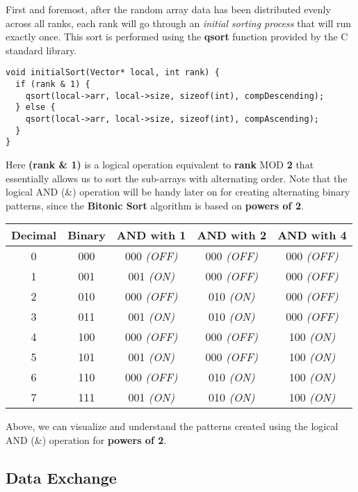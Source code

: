 \documentclass[12pt]{report}
\begin{document}
First and foremost, after the random array data has been distributed evenly across all ranks, each rank will go through an \textit{initial sorting process} that will run exactly once. This sort is performed using the \textbf{qsort} function provided by the C standard library.
\begin{lstlisting}[style=cstyle]
void initialSort(Vector* local, int rank) {
  if (rank & 1) {
    qsort(local->arr, local->size, sizeof(int), compDescending);
  } else { 
    qsort(local->arr, local->size, sizeof(int), compAscending);
  }
}
\end{lstlisting}
Here \textbf{(rank \& 1)} is a logical operation equivalent to \textbf{rank} MOD \textbf{2}  that essentially allows us to sort the sub-arrays with alternating order. 
Note that the logical AND (\&) operation will be handy later on for creating alternating binary patterns, since the \textbf{Bitonic Sort} algorithm is based on \textbf{powers of 2}.

\vspace{1cm}
\begin{tabular}{|c|c|c|c|c|}
\hline
\textbf{Decimal} & \textbf{Binary} & \textbf{AND with 1} & \textbf{AND with 2} & \textbf{AND with 4} \\ \hline
0 & 000 & 000 \textit{(OFF)}& 000 \textit{(OFF)}& 000 \textit{(OFF)}\\ \hline
1 & 001 & 001 \textit{(ON)}& 000 \textit{(OFF)}& 000 \textit{(OFF)}\\ \hline
2 & 010 & 000 \textit{(OFF)}& 010 \textit{(ON)}& 000 \textit{(OFF)}\\ \hline
3 & 011 & 001 \textit{(ON)}& 010 \textit{(ON)}& 000 \textit{(OFF)}\\ \hline
4 & 100 & 000 \textit{(OFF)}& 000 \textit{(OFF)}& 100 \textit{(ON)}\\ \hline
5 & 101 & 001 \textit{(ON)}& 000 \textit{(OFF)}& 100 \textit{(ON)}\\ \hline
6 & 110 & 000 \textit{(OFF)}& 010 \textit{(ON)}& 100 \textit{(ON)}\\ \hline
7 & 111 & 001 \textit{(ON)}& 010 \textit{(ON)}& 100 \textit{(ON)}\\ \hline
\end{tabular}
\vspace{1cm}

Above, we can visualize and understand the patterns created using the logical AND ({\&}) operation for \textbf{powers of 2}.

\subsection{Data Exchange}
\end{document}
